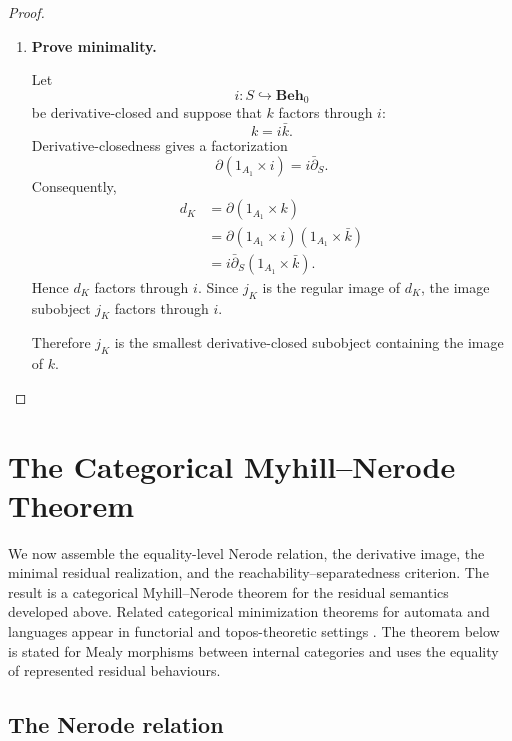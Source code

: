 \begin{proof}
\begin{enumerate}
        \item \textbf{Prove minimality.}

        Let
        \[
            i:S\hookrightarrow\mathbf{Beh}_0
        \]
        be derivative-closed and suppose that \(k\) factors through \(i\):
        \[
            k=i\bar k.
        \]
        Derivative-closedness gives a factorization
        \[
            \partial(1_{A_1}\times i)
            =
            i\bar\partial_S.
        \]
        Consequently,
        \[
            \begin{aligned}
                d_K
                &=
                \partial(1_{A_1}\times k)
                \\
                &=
                \partial(1_{A_1}\times i)
                (1_{A_1}\times\bar k)
                \\
                &=
                i\bar\partial_S
                (1_{A_1}\times\bar k).
            \end{aligned}
        \]
        Hence \(d_K\) factors through \(i\). Since \(j_K\) is the regular
        image of \(d_K\), the image subobject \(j_K\) factors through \(i\).

        Therefore \(j_K\) is the smallest derivative-closed subobject
        containing the image of \(k\).
    \end{enumerate}
\end{proof}

\section{The Categorical Myhill--Nerode Theorem}
\label{sec:categorical-myhill-nerode-theorem}

We now assemble the equality-level Nerode relation, the derivative image, the minimal residual realization, and the reachability--separatedness criterion. The result is a categorical Myhill--Nerode theorem for the residual semantics developed above. Related categorical minimization theorems for automata and languages appear in functorial and topos-theoretic settings \cite{ColcombetPetrisan2020,Iwaniack2023}. The theorem below is stated for Mealy morphisms between internal categories and uses the equality of represented residual behaviours.

\subsection{The Nerode relation}
\label{subsec:nerode-relation}

